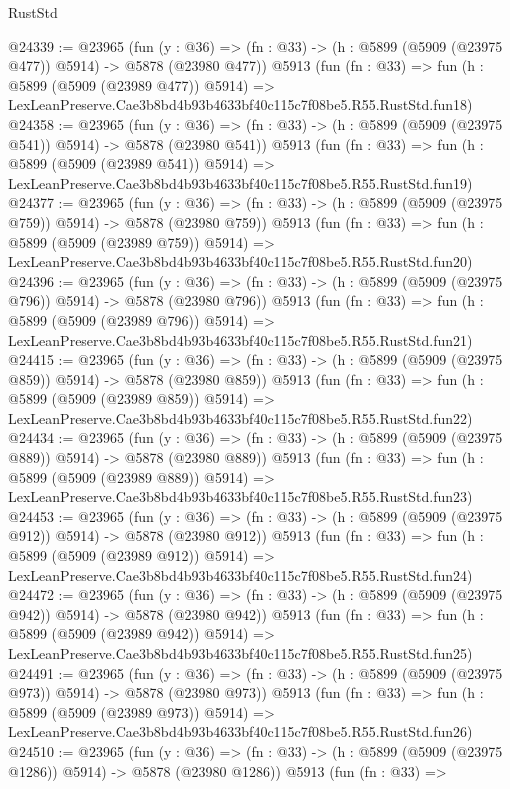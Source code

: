 \begin{lexlean}{RustStd}
\begin{coremodule}
{{@24339 := @23965
    (fun (y : @36) => (fn : @33) -> (h : @5899 (@5909 (@23975 @477)) @5914) -> @5878 (@23980 @477))
    @5913
    (fun (fn : @33) =>
    fun (h : @5899 (@5909 (@23989 @477)) @5914) =>
    LexLeanPreserve.Cae3b8bd4b93b4633bf40c115c7f08be5.R55.RustStd.fun18)
@24358 := @23965
    (fun (y : @36) => (fn : @33) -> (h : @5899 (@5909 (@23975 @541)) @5914) -> @5878 (@23980 @541))
    @5913
    (fun (fn : @33) =>
    fun (h : @5899 (@5909 (@23989 @541)) @5914) =>
    LexLeanPreserve.Cae3b8bd4b93b4633bf40c115c7f08be5.R55.RustStd.fun19)
@24377 := @23965
    (fun (y : @36) => (fn : @33) -> (h : @5899 (@5909 (@23975 @759)) @5914) -> @5878 (@23980 @759))
    @5913
    (fun (fn : @33) =>
    fun (h : @5899 (@5909 (@23989 @759)) @5914) =>
    LexLeanPreserve.Cae3b8bd4b93b4633bf40c115c7f08be5.R55.RustStd.fun20)
@24396 := @23965
    (fun (y : @36) => (fn : @33) -> (h : @5899 (@5909 (@23975 @796)) @5914) -> @5878 (@23980 @796))
    @5913
    (fun (fn : @33) =>
    fun (h : @5899 (@5909 (@23989 @796)) @5914) =>
    LexLeanPreserve.Cae3b8bd4b93b4633bf40c115c7f08be5.R55.RustStd.fun21)
@24415 := @23965
    (fun (y : @36) => (fn : @33) -> (h : @5899 (@5909 (@23975 @859)) @5914) -> @5878 (@23980 @859))
    @5913
    (fun (fn : @33) =>
    fun (h : @5899 (@5909 (@23989 @859)) @5914) =>
    LexLeanPreserve.Cae3b8bd4b93b4633bf40c115c7f08be5.R55.RustStd.fun22)
@24434 := @23965
    (fun (y : @36) => (fn : @33) -> (h : @5899 (@5909 (@23975 @889)) @5914) -> @5878 (@23980 @889))
    @5913
    (fun (fn : @33) =>
    fun (h : @5899 (@5909 (@23989 @889)) @5914) =>
    LexLeanPreserve.Cae3b8bd4b93b4633bf40c115c7f08be5.R55.RustStd.fun23)
@24453 := @23965
    (fun (y : @36) => (fn : @33) -> (h : @5899 (@5909 (@23975 @912)) @5914) -> @5878 (@23980 @912))
    @5913
    (fun (fn : @33) =>
    fun (h : @5899 (@5909 (@23989 @912)) @5914) =>
    LexLeanPreserve.Cae3b8bd4b93b4633bf40c115c7f08be5.R55.RustStd.fun24)
@24472 := @23965
    (fun (y : @36) => (fn : @33) -> (h : @5899 (@5909 (@23975 @942)) @5914) -> @5878 (@23980 @942))
    @5913
    (fun (fn : @33) =>
    fun (h : @5899 (@5909 (@23989 @942)) @5914) =>
    LexLeanPreserve.Cae3b8bd4b93b4633bf40c115c7f08be5.R55.RustStd.fun25)
@24491 := @23965
    (fun (y : @36) => (fn : @33) -> (h : @5899 (@5909 (@23975 @973)) @5914) -> @5878 (@23980 @973))
    @5913
    (fun (fn : @33) =>
    fun (h : @5899 (@5909 (@23989 @973)) @5914) =>
    LexLeanPreserve.Cae3b8bd4b93b4633bf40c115c7f08be5.R55.RustStd.fun26)
@24510 := @23965
    (fun (y : @36) =>
    (fn : @33) -> (h : @5899 (@5909 (@23975 @1286)) @5914) -> @5878 (@23980 @1286))
    @5913
    (fun (fn : @33) =>
}}
\end{coremodule}
\end{lexlean}
